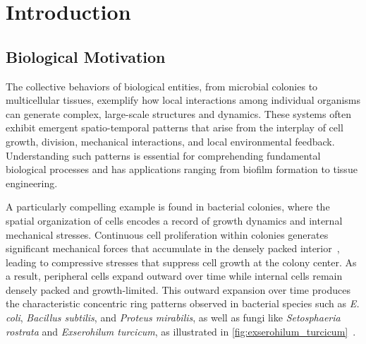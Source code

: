 \documentclass[conference]{IEEEtran}
\begin{document}
\section{Introduction}
\subsection{Biological Motivation}

The collective behaviors of biological entities, from microbial colonies to multicellular tissues, exemplify how local interactions among individual organisms can generate complex, large-scale structures and dynamics. These systems often exhibit emergent spatio-temporal patterns that arise from the interplay of cell growth, division, mechanical interactions, and local environmental feedback. Understanding such patterns is essential for comprehending fundamental biological processes and has applications ranging from biofilm formation to tissue engineering.

A particularly compelling example is found in bacterial colonies, where the spatial organization of cells encodes a record of growth dynamics and internal mechanical stresses. Continuous cell proliferation within colonies generates significant mechanical forces that accumulate in the densely packed interior~\cite{Wittmann2023}, leading to compressive stresses that suppress cell growth at the colony center. As a result, peripheral cells expand outward over time while internal cells remain densely packed and growth-limited. This outward expansion over time produces the characteristic concentric ring patterns observed in bacterial species such as \textit{E. coli}, \textit{Bacillus subtilis}, and \textit{Proteus mirabilis}, as well as fungi like \textit{Setosphaeria rostrata} and \textit{Exserohilum turcicum}, as illustrated in \autoref{fig:exserohilum_turcicum}~\cite{YAMAZAKI2005136}.
\end{document}
